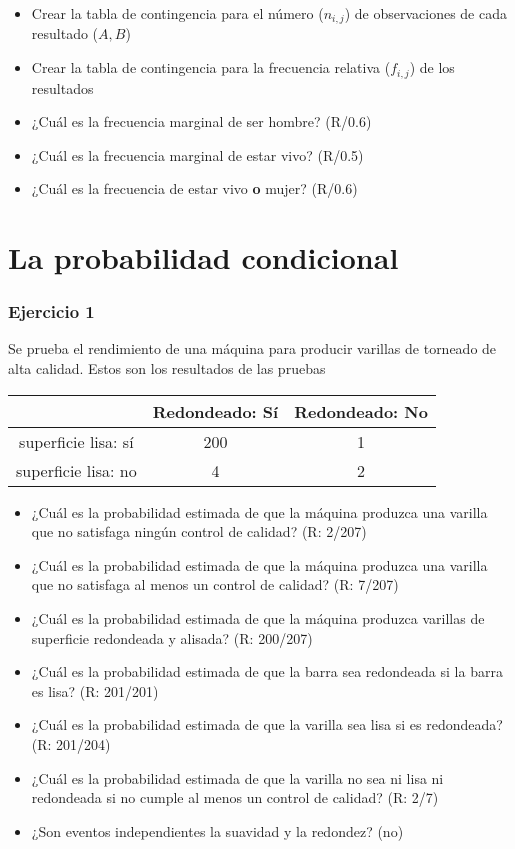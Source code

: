 \documentclass[
]{book}
\providecommand{\tightlist}{%
  \setlength{\itemsep}{0pt}\setlength{\parskip}{0pt}}
\begin{document}
\begin{itemize}
\tightlist
\item
  Crear la tabla de contingencia para el número (\(n_{i,j}\)) de observaciones de cada resultado (\(A,B\))
\item
  Crear la tabla de contingencia para la frecuencia relativa (\(f_{i,j}\)) de los resultados
\item
  ¿Cuál es la frecuencia marginal de ser hombre? (R/0.6)
\item
  ¿Cuál es la frecuencia marginal de estar vivo? (R/0.5)
\item
  ¿Cuál es la frecuencia de estar vivo \textbf{o} mujer? (R/0.6)
\end{itemize}

\hypertarget{la-probabilidad-condicional-2}{%
\section{La probabilidad condicional}\label{la-probabilidad-condicional-2}}

\hypertarget{ejercicio-1-2}{%
\subsubsection{Ejercicio 1}\label{ejercicio-1-2}}

Se prueba el rendimiento de una máquina para producir varillas de torneado de alta calidad. Estos son los resultados de las pruebas

\begin{longtable}[]{@{}ccc@{}}
\toprule
& Redondeado: Sí & Redondeado: No \\
\midrule
\endhead
superficie lisa: sí & 200 & 1 \\
superficie lisa: no & 4 & 2 \\
\bottomrule
\end{longtable}

\begin{itemize}
\item
  ¿Cuál es la probabilidad estimada de que la máquina produzca una varilla que no satisfaga ningún control de calidad? (R: 2/207)
\item
  ¿Cuál es la probabilidad estimada de que la máquina produzca una varilla que no satisfaga al menos un control de calidad? (R: 7/207)
\item
  ¿Cuál es la probabilidad estimada de que la máquina produzca varillas de superficie redondeada y alisada? (R: 200/207)
\item
  ¿Cuál es la probabilidad estimada de que la barra sea redondeada si la barra es lisa? (R: 201/201)
\item
  ¿Cuál es la probabilidad estimada de que la varilla sea lisa si es redondeada? (R: 201/204)
\item
  ¿Cuál es la probabilidad estimada de que la varilla no sea ni lisa ni redondeada si no cumple al menos un control de calidad? (R: 2/7)
\item
  ¿Son eventos independientes la suavidad y la redondez? (no)
\end{itemize}
\end{document}
